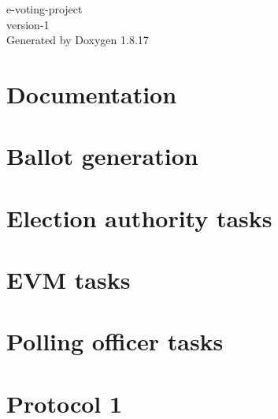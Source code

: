 \let\mypdfximage\pdfximage\def\pdfximage{\immediate\mypdfximage}\documentclass[twoside]{book}
\newcommand{\+}{\discretionary{\mbox{\scriptsize$\hookleftarrow$}}{}{}}
\newcommand{\clearemptydoublepage}{%
  \newpage{\pagestyle{empty}\cleardoublepage}%
}
\begin{document}
\hypersetup{pageanchor=false,
             bookmarksnumbered=true,
             pdfencoding=unicode
            }
\begin{titlepage}
\vspace*{7cm}
\begin{center}%
{\Large e-\/voting-\/project \\[1ex]\large version-\/1 }\\
\vspace*{1cm}
{\large Generated by Doxygen 1.8.17}\\
\end{center}
\end{titlepage}
\clearemptydoublepage
{}
\tableofcontents
\clearemptydoublepage
{}
\hypersetup{pageanchor=true}

\chapter{Documentation}
\label{md_docs__r_e_a_d_m_e}

\chapter{Ballot generation}
\label{md_include_protocol_ea_ballot__r_e_a_d_m_e}

\chapter{Election authority tasks}
\label{md_include_protocol_ea__r_e_a_d_m_e}

\chapter{E\+VM tasks}
\label{md_include_protocol_evm__r_e_a_d_m_e}

\chapter{Polling officer tasks}
\label{md_include_protocol_po__r_e_a_d_m_e}

\chapter{Protocol 1}
\label{md_include_protocol__r_e_a_d_m_e}

\end{document}

